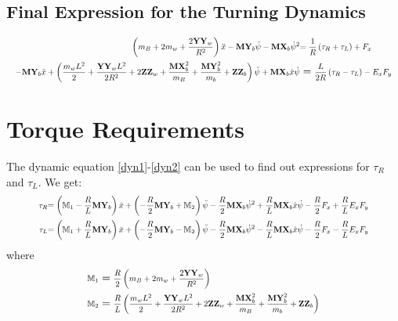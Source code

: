 \documentclass[a4paper,10pt]{article}
\newcommand\scalemath[2]{\scalebox{#1}{\mbox{\ensuremath{\displaystyle #2}}}}
\begin{document}
\subsection{Final Expression for the Turning Dynamics}
\begin{align}
  \scalemath{0.75}{\left(m_B+2m_w+\frac{2\mathbf{YY}_w}{R^2}\right)\ddot{x} - \mathbf{MY}_b\ddot\psi -\mathbf{MX}_b\dot\psi^2} &\scalemath{0.75}{= \frac{1}{R}\left(\tau_R + \tau_L\right) + F_x} \label{dyn1}\\
  \scalemath{0.75}{-\mathbf{MY}_b\ddot{x} + \left(\frac{m_wL^2}{2}+\frac{\mathbf{YY}_wL^2}{2R^2}+2\mathbf{ZZ}_w + \frac{\mathbf{MX}_b^2}{m_B} + \frac{\mathbf{MY}_b^2}{m_b}  + \mathbf{ZZ}_b\right)\ddot\psi + \mathbf{MX}_b\dot{x}\dot\psi} &= \scalemath{0.75}{\frac{L}{2R}\left(\tau_R-\tau_L\right) - E_xF_y} \label{dyn2}
\end{align}

\section{Torque Requirements}
The dynamic equation \ref{dyn1}-\ref{dyn2} can be used to find out expressions for $\tau_R$ and $\tau_L$. We get:
\begin{align}
 \scalemath{0.75}{\tau_R} & \scalemath{0.75}{=\left(\mathbb{M}_1-\frac{R}{L}\mathbf{MY}_b\right)\ddot{x} + \left(-\frac{R}{2}\mathbf{MY}_b+\mathbb{M}_2\right)\ddot\psi - \frac{R}{2}\mathbf{MX}_b\dot\psi^2 + \frac{R}{L}\mathbf{MX}_b\dot{x}\dot\psi - \frac{R}{2}F_x + \frac{R}{L}E_xF_y} \\
 \scalemath{0.75}{\tau_L} & \scalemath{0.75}{=\left(\mathbb{M}_1+\frac{R}{L}\mathbf{MY}_b\right)\ddot{x} + \left(-\frac{R}{2}\mathbf{MY}_b-\mathbb{M}_2\right)\ddot\psi - \frac{R}{2}\mathbf{MX}_b\dot\psi^2 - \frac{R}{L}\mathbf{MX}_b\dot{x}\dot\psi - \frac{R}{2}F_x - \frac{R}{L}E_xF_y} 
\end{align}where
\begin{align}
 \scalemath{0.75}{\mathbb{M}_1} &= \scalemath{0.75}{\frac{R}{2}\left(m_B+2m_w+\frac{2\mathbf{YY}_w}{R^2}\right)} \label{M1} \\
 \scalemath{0.75}{\mathbb{M}_2} &= \scalemath{0.75}{\frac{R}{L}\left(\frac{m_wL^2}{2}+\frac{\mathbf{YY}_wL^2}{2R^2}+2\mathbf{ZZ}_w + \frac{\mathbf{MX}_b^2}{m_B} + \frac{\mathbf{MY}_b^2}{m_b}  + \mathbf{ZZ}_b\right)} \label{M2}
\end{align}
\end{document}
